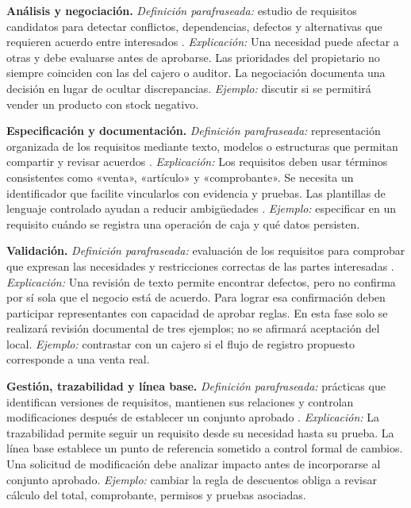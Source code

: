 \documentclass[onecolumn,12pt,a4paper]{IEEEtran}
\begin{document}
\textbf{Análisis y negociación.} \emph{Definición parafraseada:} estudio de requisitos candidatos para detectar conflictos, dependencias, defectos y alternativas que requieren acuerdo entre interesados \cite{pohl2025,ireb2023}. \emph{Explicación:} Una necesidad puede afectar a otras y debe evaluarse antes de aprobarse. Las prioridades del propietario no siempre coinciden con las del cajero o auditor. La negociación documenta una decisión en lugar de ocultar discrepancias. \emph{Ejemplo:} discutir si se permitirá vender un producto con stock negativo.

\textbf{Especificación y documentación.} \emph{Definición parafraseada:} representación organizada de los requisitos mediante texto, modelos o estructuras que permitan compartir y revisar acuerdos \cite{iso29148,pohl2025}. \emph{Explicación:} Los requisitos deben usar términos consistentes como «venta», «artículo» y «comprobante». Se necesita un identificador que facilite vincularlos con evidencia y pruebas. Las plantillas de lenguaje controlado ayudan a reducir ambigüedades \cite{mavin2009}. \emph{Ejemplo:} especificar en un requisito cuándo se registra una operación de caja y qué datos persisten.

\textbf{Validación.} \emph{Definición parafraseada:} evaluación de los requisitos para comprobar que expresan las necesidades y restricciones correctas de las partes interesadas \cite{pohl2025,iso29148}. \emph{Explicación:} Una revisión de texto permite encontrar defectos, pero no confirma por sí sola que el negocio está de acuerdo. Para lograr esa confirmación deben participar representantes con capacidad de aprobar reglas. En esta fase solo se realizará revisión documental de tres ejemplos; no se afirmará aceptación del local. \emph{Ejemplo:} contrastar con un cajero si el flujo de registro propuesto corresponde a una venta real.

\textbf{Gestión, trazabilidad y línea base.} \emph{Definición parafraseada:} prácticas que identifican versiones de requisitos, mantienen sus relaciones y controlan modificaciones después de establecer un conjunto aprobado \cite{pohl2025,iso29148,ireb2023,hull2011}. \emph{Explicación:} La trazabilidad permite seguir un requisito desde su necesidad hasta su prueba. La línea base establece un punto de referencia sometido a control formal de cambios. Una solicitud de modificación debe analizar impacto antes de incorporarse al conjunto aprobado. \emph{Ejemplo:} cambiar la regla de descuentos obliga a revisar cálculo del total, comprobante, permisos y pruebas asociadas.
\end{document}
